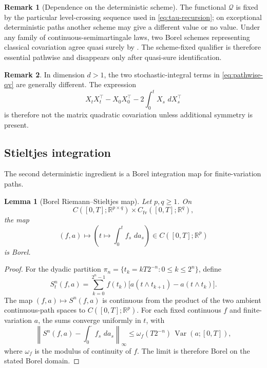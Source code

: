 \documentclass[11pt,reqno]{amsart}
\theoremstyle{plain}
\newtheorem{lemma}[lemma]{Lemma}
\theoremstyle{definition}
\newtheorem{remark}[remark]{Remark}
\newcommand{\R}{\mathbb R}
\newcommand{\dd}{\,d}
\newcommand{\qv}{\mathcal Q}
\newcommand{\Var}{\operatorname{Var}}
\newcommand{\norm}[1]{\left\lVert #1\right\rVert}
\begin{document}
\begin{remark}[Dependence on the deterministic scheme]
\label{rem:qv-scheme}
The functional \(\qv\) is fixed by the particular level-crossing sequence
used in \eqref{eq:tau-recursion}; on exceptional deterministic paths another
scheme may give a different value or no value.  Under any family of
continuous-semimartingale laws, two Borel schemes representing classical
covariation agree quasi surely by .  The
scheme-fixed qualifier is therefore essential pathwise and disappears only
after quasi-sure identification.
\end{remark}

\begin{remark}
In dimension \(d>1\), the two stochastic-integral terms in
\eqref{eq:pathwise-qv} are generally different.  The expression
\[
  X_tX_t^\top-X_0X_0^\top
  -2\int_0^tX_s\,\dd X_s^\top
\]
is therefore not the matrix quadratic covariation unless additional
symmetry is present.
\end{remark}

\subsection{Stieltjes integration}

The second deterministic ingredient is a Borel integration map for
finite-variation paths.

\begin{lemma}[Borel Riemann--Stieltjes map]\label{lem:stieltjes-borel}
Let \(p,q\ge1\).  On
\[
  C([0,T];\R^{p\times q})
  \times
  C_{\mathrm{fv}}([0,T];\R^q),
\]
the map
\[
  (f,a)\longmapsto
  \left(t\longmapsto\int_0^t f_s\,\dd a_s\right)
  \in C([0,T];\R^p)
\]
is Borel.
\end{lemma}

\begin{proof}
For the dyadic partition
\(\pi_n=\{t_k=kT2^{-n}:0\le k\le2^n\}\), define
\[
  S_t^n(f,a)
  =
  \sum_{k=0}^{2^n-1}
  f(t_k)
  \bigl[
    a(t\wedge t_{k+1})-a(t\wedge t_k)
  \bigr].
\]
The map \((f,a)\mapsto S^n(f,a)\) is continuous from the product of the two
ambient continuous-path spaces to \(C([0,T];\R^p)\).  For each fixed
continuous \(f\) and finite-variation \(a\), the sums converge uniformly in
\(t\), with
\[
  \norm{
    S^n(f,a)-\int_0^\cdot f_s\,\dd a_s
  }_\infty
  \le
  \omega_f(T2^{-n})\,\Var(a;[0,T]),
\]
where \(\omega_f\) is the modulus of continuity of \(f\).  The limit is
therefore Borel on the stated Borel domain.
\end{proof}
\end{document}
